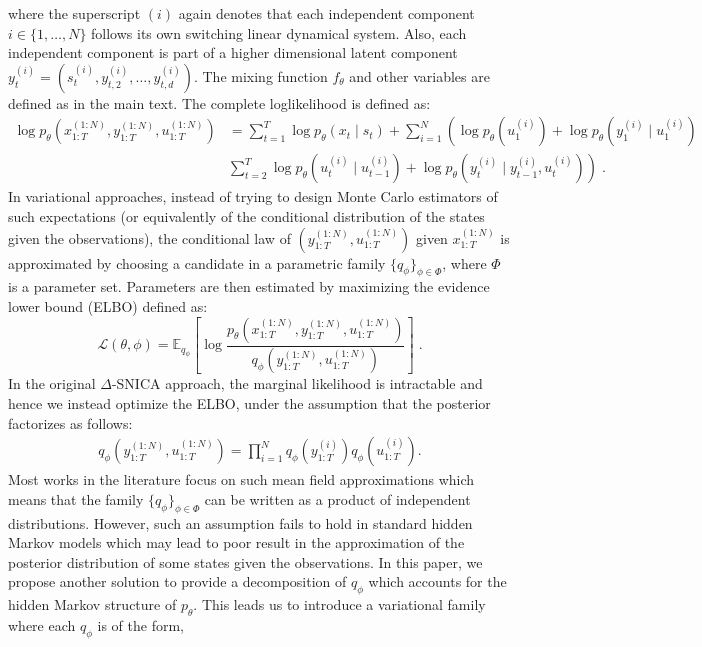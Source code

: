 \documentclass{article}
\newcommand{\parvec}{\theta}
\def\pE{\mathbb{E}}
\newcommand{\eqsp}{\;}
\begin{document}
where the superscript $(i)$ again denotes that each independent component $i \in \{1,\dots, N\}$ follows its own switching linear dynamical system. Also, each independent component is part of a higher dimensional latent component $ y_t^{(i)} = (s_t^{(i)}, y_{t, 2}^{(i)},\dots, y_{t, d}^{(i)})$. The mixing function $f_\theta$ and other variables are defined as in the main text. The complete loglikelihood is defined as:
\begin{align}
	\log p_\theta( x_{1:T}^{(1:N)},  y_{1:T}^{(1:N)}, u_{1:T}^{(1:N)}) &= \sum_{t=1}^T \log p_\theta( x_t \mid  s_t) + \sum_{i=1}^N\left(\log p_\theta(u_1^{(i)}) +\log p_\theta( y_1^{(i)} \mid u_1^{(i)}) \right. \nonumber \\
	&\left. \sum_{t=2}^T \log p_\theta(u_t^{(i)}\mid u_{t-1}^{(i)}) + \log p_\theta( y_t^{(i)} \mid  y_{t-1}^{(i)}, u_t^{(i)}) \right) \eqsp.
\end{align}
In variational approaches, instead of trying to design Monte Carlo estimators of such expectations (or equivalently of the conditional distribution of the states given the observations), the conditional law of $(y_{1:T}^{(1:N)}, u_{1:T}^{(1:N)})$ given $x_{1:T}^{(1:N)}$ is approximated by choosing a candidate in a parametric family $\{q_\phi\}_{\phi \in \Phi}$, where $\Phi$ is a parameter set. Parameters are then estimated by maximizing the  evidence lower bound (ELBO) defined as:
$$
\mathcal{L}(\parvec,\phi) = \pE_{q_\phi}\left[\log \frac{p_\parvec(x_{1:T}^{(1:N)},  y_{1:T}^{(1:N)}, u_{1:T}^{(1:N)})}{q_\phi(y_{1:T}^{(1:N)}, u_{1:T}^{(1:N)})}\right]\eqsp.
$$
In the original $\Delta$-SNICA approach, the marginal likelihood is intractable and hence we instead optimize the ELBO, under the assumption that the posterior factorizes as follows:
\begin{align}
q_\phi( y_{1:T}^{(1:N)}, u_{1:T}^{(1:N)}) = \prod_{i=1}^N q_\phi( y_{1:T}^{(i)}) q_\phi(u_{1:T}^{(i)}). \label{eq:factorization}
\end{align}
Most works in the literature focus on such mean field approximations which means that the family $\{q_\phi\}_{\phi \in \Phi}$ can be written as a product of independent distributions. However, such an assumption fails to hold in standard hidden Markov models which may lead to poor result in the approximation of the posterior distribution of some states given the observations. In this paper, we propose another solution to provide a decomposition of   $q_\phi$ which accounts for the hidden Markov structure of $p_\parvec$.  This leads us to introduce a variational family where each $q_\phi$ is of the form,
\end{document}
